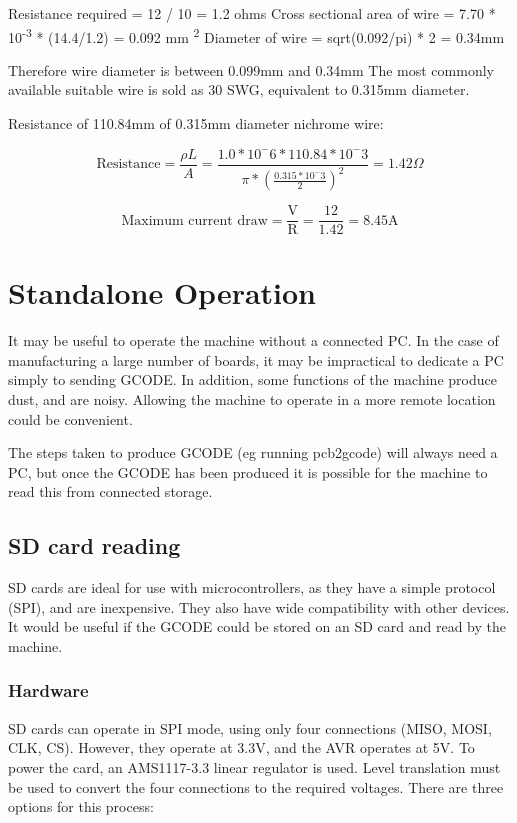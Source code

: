 \documentclass[a4paper,11pt]{article}  %
\begin{document}
Resistance required = 12 / 10 = 1.2 ohms
Cross sectional area of wire = 7.70 * 10\textsuperscript{-3} * (14.4/1.2) = 0.092 mm \textsuperscript{2}
Diameter of wire = sqrt(0.092/pi) * 2 = 0.34mm

Therefore wire diameter is between 0.099mm and 0.34mm
The most commonly available suitable wire is sold as 30 SWG, equivalent to 0.315mm diameter.

Resistance of 110.84mm of 0.315mm diameter nichrome wire:

\begin{displaymath}
\text{Resistance} = \frac{\rho L}{A}
= \frac{1.0*10^-6*110.84*10^-3}{\pi*(\frac{0.315*10^-3}{2})^2}
= 1.42 \Omega
\end{displaymath}



\begin{displaymath}
\text{Maximum current draw} = \frac{\text{V}}{\text{R}}
= \frac{12}{1.42}
= 8.45 \text{A}
\end{displaymath}

\section{Standalone Operation}
It may be useful to operate the machine without a connected PC. In the case of manufacturing a large number of boards, it may be impractical to dedicate a PC simply to sending GCODE.
In addition, some functions of the machine produce dust, and are noisy. Allowing the machine to operate in a more remote location could be convenient. 

The steps taken to produce GCODE (eg running pcb2gcode) will always need a PC, but once the GCODE has been produced it is possible for the machine to read this from connected storage.

\subsection{SD card reading}
SD cards are ideal for use with microcontrollers, as they have a simple protocol (SPI), and are inexpensive. They also have wide compatibility with other devices. It would be useful if 
the GCODE could be stored on an SD card and read by the machine.

\subsubsection {Hardware}
SD cards can operate in SPI mode, using only four connections (MISO, MOSI, CLK, CS). However, they operate at 3.3V, and the AVR operates at 5V. To power the card, an AMS1117-3.3 linear regulator
is used. Level translation must be used to convert the four connections to the required voltages. There are three options for this process:
\end{document}
